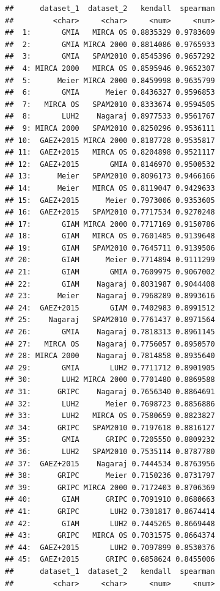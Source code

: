 \documentclass[
  11pt,
]{article}
\begin{document}
\begin{verbatim}
##      dataset_1  dataset_2   kendall  spearman
##         <char>     <char>     <num>     <num>
##  1:       GMIA   MIRCA OS 0.8835329 0.9783609
##  2:       GMIA MIRCA 2000 0.8814086 0.9765933
##  3:       GMIA   SPAM2010 0.8545396 0.9657292
##  4: MIRCA 2000   MIRCA OS 0.8595946 0.9652307
##  5:      Meier MIRCA 2000 0.8459998 0.9635799
##  6:       GMIA      Meier 0.8436327 0.9596853
##  7:   MIRCA OS   SPAM2010 0.8333674 0.9594505
##  8:       LUH2    Nagaraj 0.8977533 0.9561767
##  9: MIRCA 2000   SPAM2010 0.8250296 0.9536111
## 10:  GAEZ+2015 MIRCA 2000 0.8187728 0.9535817
## 11:  GAEZ+2015   MIRCA OS 0.8204898 0.9521117
## 12:  GAEZ+2015       GMIA 0.8146970 0.9500532
## 13:      Meier   SPAM2010 0.8096173 0.9466166
## 14:      Meier   MIRCA OS 0.8119047 0.9429633
## 15:  GAEZ+2015      Meier 0.7973006 0.9353605
## 16:  GAEZ+2015   SPAM2010 0.7717534 0.9270248
## 17:       GIAM MIRCA 2000 0.7717169 0.9150786
## 18:       GIAM   MIRCA OS 0.7601485 0.9139648
## 19:       GIAM   SPAM2010 0.7645711 0.9139506
## 20:       GIAM      Meier 0.7714894 0.9111299
## 21:       GIAM       GMIA 0.7609975 0.9067002
## 22:       GIAM    Nagaraj 0.8031987 0.9044408
## 23:      Meier    Nagaraj 0.7968289 0.8993616
## 24:  GAEZ+2015       GIAM 0.7402983 0.8991512
## 25:    Nagaraj   SPAM2010 0.7761437 0.8971564
## 26:       GMIA    Nagaraj 0.7818313 0.8961145
## 27:   MIRCA OS    Nagaraj 0.7756057 0.8950570
## 28: MIRCA 2000    Nagaraj 0.7814858 0.8935640
## 29:       GMIA       LUH2 0.7711712 0.8901905
## 30:       LUH2 MIRCA 2000 0.7701480 0.8869588
## 31:      GRIPC    Nagaraj 0.7656340 0.8864691
## 32:       LUH2      Meier 0.7698723 0.8856886
## 33:       LUH2   MIRCA OS 0.7580659 0.8823827
## 34:      GRIPC   SPAM2010 0.7197618 0.8816127
## 35:       GMIA      GRIPC 0.7205550 0.8809232
## 36:       LUH2   SPAM2010 0.7535114 0.8787780
## 37:  GAEZ+2015    Nagaraj 0.7444534 0.8763956
## 38:      GRIPC      Meier 0.7150236 0.8731797
## 39:      GRIPC MIRCA 2000 0.7172403 0.8706369
## 40:       GIAM      GRIPC 0.7091910 0.8680663
## 41:      GRIPC       LUH2 0.7301817 0.8674414
## 42:       GIAM       LUH2 0.7445265 0.8669448
## 43:      GRIPC   MIRCA OS 0.7031575 0.8664374
## 44:  GAEZ+2015       LUH2 0.7097899 0.8530376
## 45:  GAEZ+2015      GRIPC 0.6858624 0.8455006
##      dataset_1  dataset_2   kendall  spearman
##         <char>     <char>     <num>     <num>
\end{verbatim}
\end{document}
